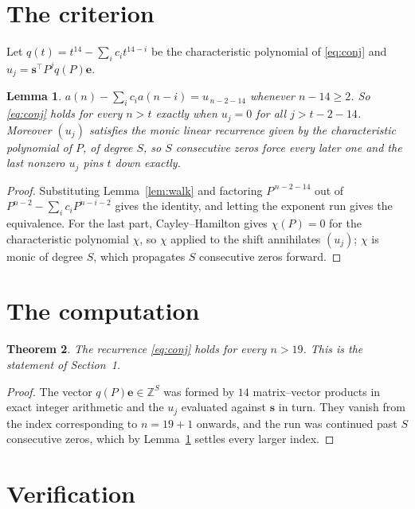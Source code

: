 \documentclass[11pt,a4paper]{article}
\theoremstyle{plain}
\newtheorem{theorem}{Theorem}
\newtheorem{lemma}[theorem]{Lemma}
\theoremstyle{definition}
\begin{document}
\section{The criterion}

Let $q(t)=t^{14}-\sum_i c_i t^{14-i}$ be the characteristic polynomial of
\eqref{eq:conj} and $u_j=\mathbf{s}^{\!\top}P^{j}q(P)\mathbf{e}$.

\begin{lemma}\label{lem:crit}
$a(n)-\sum_i c_i a(n-i)=u_{\,n-2-14}$ whenever $n-14\ge2$. So \eqref{eq:conj}
holds for every $n>t$ exactly when $u_j=0$ for all $j>t-2-14$. Moreover $(u_j)$
satisfies the monic linear recurrence given by the characteristic polynomial of $P$, of
degree $S$, so $S$ consecutive zeros force every later one and the last nonzero $u_j$ pins
$t$ down exactly.
\end{lemma}

\begin{proof}
Substituting Lemma~\ref{lem:walk} and factoring $P^{\,n-2-14}$ out of
$P^{n-2}-\sum_i c_i P^{n-i-2}$ gives the identity, and letting the exponent run gives the
equivalence. For the last part, Cayley--Hamilton gives $\chi(P)=0$ for the characteristic
polynomial $\chi$, so $\chi$ applied to the shift annihilates $(u_j)$; $\chi$ is monic of
degree $S$, which propagates $S$ consecutive zeros forward.
\end{proof}

\section{The computation}

\begin{theorem}
The recurrence \eqref{eq:conj} holds for every $n>19$. This is the statement of
Section~1.
\end{theorem}

\begin{proof}
The vector $q(P)\mathbf{e}\in\mathbb{Z}^{S}$ was formed by $14$ matrix--vector
products in exact integer arithmetic and the $u_j$ evaluated against $\mathbf{s}$ in turn.
They vanish from the index corresponding to $n=19+1$ onwards, and the run was continued
past $S$ consecutive zeros, which by Lemma~\ref{lem:crit} settles every larger index.
\end{proof}

\section{Verification}
\end{document}
